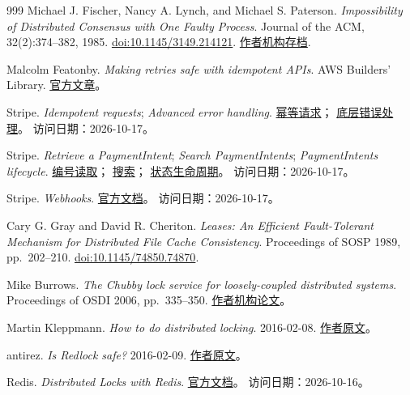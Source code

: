 \begin{thebibliography}{999}
Michael J. Fischer, Nancy A. Lynch, and Michael S. Paterson.
\textit{Impossibility of Distributed Consensus with One Faulty Process}.
Journal of the ACM, 32(2):374--382, 1985.
\href{https://doi.org/10.1145/3149.214121}{doi:10.1145/3149.214121}.
\href{https://groups.csail.mit.edu/tds/papers/Lynch/jacm85.pdf}{作者机构存档}.

Malcolm Featonby.
\textit{Making retries safe with idempotent APIs}.
AWS Builders' Library.
\href{https://aws.amazon.com/builders-library/making-retries-safe-with-idempotent-APIs/}{官方文章}。

Stripe.
\textit{Idempotent requests}; \textit{Advanced error handling}.
\href{https://docs.stripe.com/api/idempotent_requests}{幂等请求}；
\href{https://docs.stripe.com/error-low-level}{底层错误处理}。
访问日期：2026-10-17。

Stripe.
\textit{Retrieve a PaymentIntent}; \textit{Search PaymentIntents};
\textit{PaymentIntents lifecycle}.
\href{https://docs.stripe.com/api/payment_intents/retrieve}{编号读取}；
\href{https://docs.stripe.com/api/payment_intents/search}{搜索}；
\href{https://docs.stripe.com/payments/paymentintents/lifecycle}{状态生命周期}。
访问日期：2026-10-17。

Stripe.
\textit{Webhooks}.
\href{https://docs.stripe.com/webhooks}{官方文档}。
访问日期：2026-10-17。

Cary G. Gray and David R. Cheriton.
\textit{Leases: An Efficient Fault-Tolerant Mechanism for Distributed File Cache Consistency}.
Proceedings of SOSP 1989, pp.\ 202--210.
\href{https://doi.org/10.1145/74850.74870}{doi:10.1145/74850.74870}.

Mike Burrows.
\textit{The Chubby lock service for loosely-coupled distributed systems}.
Proceedings of OSDI 2006, pp.\ 335--350.
\href{https://research.google/pubs/the-chubby-lock-service-for-loosely-coupled-distributed-systems/}{作者机构论文}。

Martin Kleppmann.
\textit{How to do distributed locking}. 2016-02-08.
\href{https://martin.kleppmann.com/2016/02/08/how-to-do-distributed-locking.html}{作者原文}。

antirez.
\textit{Is Redlock safe?} 2016-02-09.
\href{https://antirez.com/news/101}{作者原文}。

Redis.
\textit{Distributed Locks with Redis}.
\href{https://redis.io/docs/latest/develop/clients/patterns/distributed-locks/}{官方文档}。
访问日期：2026-10-16。


\end{thebibliography}

